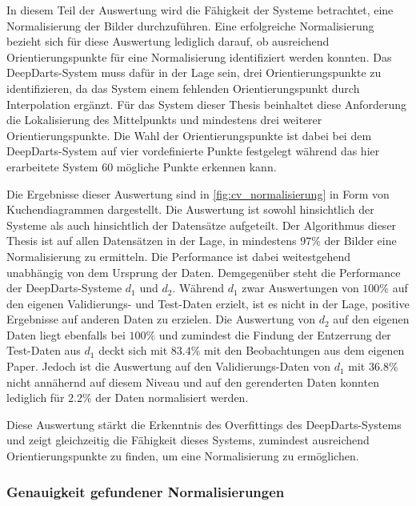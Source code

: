 In diesem Teil der Auswertung wird die Fähigkeit der Systeme betrachtet, eine Normalisierung der Bilder durchzuführen. Eine erfolgreiche Normalisierung bezieht sich für diese Auswertung lediglich darauf, ob ausreichend Orientierungspunkte für eine Normalisierung identifiziert werden konnten. Das DeepDarts-System muss dafür in der Lage sein, drei Orientierungspunkte zu identifizieren, da das System einem fehlenden Orientierungspunkt durch Interpolation ergänzt. Für das System dieser Thesis beinhaltet diese Anforderung die Lokalisierung des Mittelpunkts und mindestens drei weiterer Orientierungspunkte. Die Wahl der Orientierungspunkte ist dabei bei dem DeepDarts-System auf vier vordefinierte Punkte festgelegt während das hier erarbeitete System 60 mögliche Punkte erkennen kann.

Die Ergebnisse dieser Auswertung sind in \autoref{fig:cv_normalisierung} in Form von Kuchendiagrammen dargestellt. Die Auswertung ist sowohl hinsichtlich der Systeme als auch hinsichtlich der Datensätze aufgeteilt. Der Algorithmus dieser Thesis ist auf allen Datensätzen in der Lage, in mindestens $97\%$ der Bilder eine Normalisierung zu ermitteln. Die Performance ist dabei weitestgehend unabhängig von dem Ursprung der Daten. Demgegenüber steht die Performance der DeepDarts-Systeme $d_1$ und $d_2$. Während $d_1$ zwar Auswertungen von $100\%$ auf den eigenen Validierungs- und Test-Daten erzielt, ist es nicht in der Lage, positive Ergebnisse auf anderen Daten zu erzielen. Die Auswertung von $d_2$ auf den eigenen Daten liegt ebenfalls bei $100\%$ und zumindest die Findung der Entzerrung der Test-Daten aus $d_1$ deckt sich mit $83.4\%$ mit den Beobachtungen aus dem eigenen Paper. Jedoch ist die Auswertung auf den Validierungs-Daten von $d_1$ mit $36.8\%$ nicht annähernd auf diesem Niveau und auf den gerenderten Daten konnten lediglich für $2.2\%$ der Daten normalisiert werden.

Diese Auswertung stärkt die Erkenntnis des Overfittings des DeepDarts-Systems und zeigt gleichzeitig die Fähigkeit dieses Systems, zumindest ausreichend Orientierungspunkte zu finden, um eine Normalisierung zu ermöglichen.


\subsubsection{Genauigkeit gefundener Normalisierungen} %

